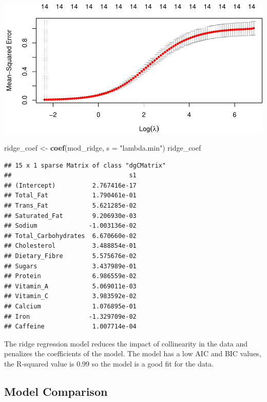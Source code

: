 \documentclass[
]{article}
\newenvironment{Shaded}{\begin{snugshade}}{\end{snugshade}}
\newcommand{\AttributeTok}[1]{\textcolor[rgb]{0.13,0.29,0.53}{#1}}
\newcommand{\FunctionTok}[1]{\textcolor[rgb]{0.13,0.29,0.53}{\textbf{#1}}}
\newcommand{\NormalTok}[1]{#1}
\newcommand{\OtherTok}[1]{\textcolor[rgb]{0.56,0.35,0.01}{#1}}
\newcommand{\StringTok}[1]{\textcolor[rgb]{0.31,0.60,0.02}{#1}}
\begin{document}
\begin{center}\includegraphics{Statistical_Learning_Final_Report_files/figure-latex/ridge_regression-1} \end{center}

\begin{Shaded}
\begin{Highlighting}[]
\NormalTok{ridge\_coef }\OtherTok{\textless{}{-}} \FunctionTok{coef}\NormalTok{(mod\_ridge, }\AttributeTok{s =} \StringTok{"lambda.min"}\NormalTok{)}
\NormalTok{ridge\_coef}
\end{Highlighting}
\end{Shaded}

\begin{verbatim}
## 15 x 1 sparse Matrix of class "dgCMatrix"
##                                s1
## (Intercept)          2.767416e-17
## Total_Fat            1.790461e-01
## Trans_Fat            5.621285e-02
## Saturated_Fat        9.206930e-03
## Sodium              -1.003136e-02
## Total_Carbohydrates  6.670660e-02
## Cholesterol          3.488854e-01
## Dietary_Fibre        5.575676e-02
## Sugars               3.437989e-01
## Protein              6.986559e-02
## Vitamin_A            5.069011e-03
## Vitamin_C            3.983592e-02
## Calcium              1.076895e-01
## Iron                -1.329709e-02
## Caffeine             1.007714e-04
\end{verbatim}

The ridge regression model reduces the impact of collinearity in the
data and penalizes the coefficients of the model. The model has a low
AIC and BIC values, the R-squared value is 0.99 so the model is a good
fit for the data.

\subsection{Model Comparison}\label{model-comparison}
\end{document}
